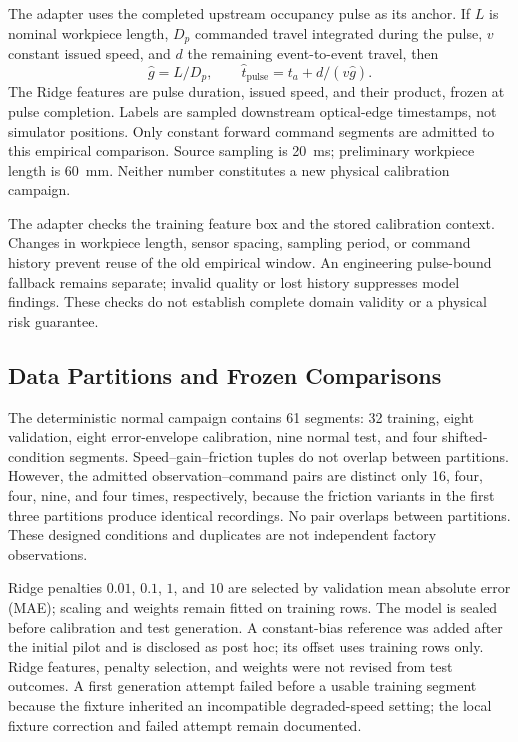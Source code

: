 The adapter uses the completed upstream occupancy pulse as its anchor. If $L$ is nominal workpiece length, $D_p$ commanded travel integrated during the pulse, $v$ constant issued speed, and $d$ the remaining event-to-event travel, then
\begin{equation}
 \widehat g=L/D_p,\qquad \widehat t_{\mathrm{pulse}}=t_a+d/(v\widehat g).
\end{equation}
The Ridge features are pulse duration, issued speed, and their product, frozen at pulse completion. Labels are sampled downstream optical-edge timestamps, not simulator positions. Only constant forward command segments are admitted to this empirical comparison. Source sampling is 20~ms; preliminary workpiece length is 60~mm. Neither number constitutes a new physical calibration campaign.

The adapter checks the training feature box and the stored calibration context. Changes in workpiece length, sensor spacing, sampling period, or command history prevent reuse of the old empirical window. An engineering pulse-bound fallback remains separate; invalid quality or lost history suppresses model findings. These checks do not establish complete domain validity or a physical risk guarantee.

\subsection{Data Partitions and Frozen Comparisons}
The deterministic normal campaign contains 61 segments: 32 training, eight validation, eight error-envelope calibration, nine normal test, and four shifted-condition segments. Speed--gain--friction tuples do not overlap between partitions. However, the admitted observation--command pairs are distinct only 16, four, four, nine, and four times, respectively, because the friction variants in the first three partitions produce identical recordings. No pair overlaps between partitions. These designed conditions and duplicates are not independent factory observations.

Ridge penalties $0.01$, $0.1$, $1$, and $10$ are selected by validation mean absolute error (MAE); scaling and weights remain fitted on training rows. The model is sealed before calibration and test generation. A constant-bias reference was added after the initial pilot and is disclosed as post hoc; its offset uses training rows only. Ridge features, penalty selection, and weights were not revised from test outcomes. A first generation attempt failed before a usable training segment because the fixture inherited an incompatible degraded-speed setting; the local fixture correction and failed attempt remain documented.

